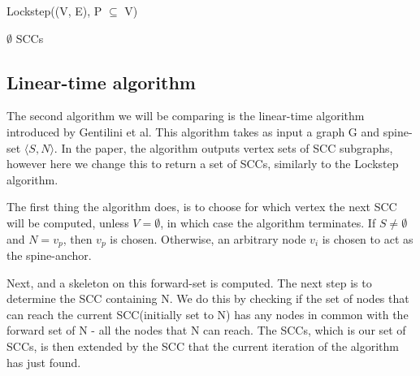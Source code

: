 \documentclass[../master/master.tex]{subfiles}
\begin{document}
\begin{algorithm}
  \caption{Lockstep((V, E), P $\subseteq$ V)}
  \begin{algorithmic}[1]
    \Statex
     \State \Return $\emptyset$
    \EndIf
    \Statex
    \Statex
    \EndWhile
    \Statex
    \Else
    \EndIf
    \Statex
    \EndWhile
    \Statex
    \State \Return SCCs
  \end{algorithmic}
\end{algorithm}

\subsection{Linear-time algorithm}
The second algorithm we will be comparing is the linear-time algorithm \cite{linear} introduced by Gentilini et al. This algorithm takes as input a graph G and spine-set $\langle S, N\rangle$. In the paper, the algorithm outputs vertex sets of SCC subgraphs, however here we change this to return a set of SCCs, similarly to the Lockstep algorithm.

The first thing the algorithm does, is to choose for which vertex the next SCC will be computed, unless $V=\emptyset$, in which case the algorithm terminates. If $S\neq\emptyset$ and $N={v_p}$, then $v_p$ is chosen. Otherwise, an arbitrary node $v_i$ is chosen to act as the spine-anchor.

Next,  and a skeleton  on this forward-set is computed. The next step is to determine the SCC containing N. We do this by checking if the set of nodes that can reach the current SCC(initially set to N) has any nodes in common with the forward set of N - all the nodes that N can reach. The SCCs, which is our set of SCCs, is then extended by the SCC that the current iteration of the algorithm has just found.
\end{document}
